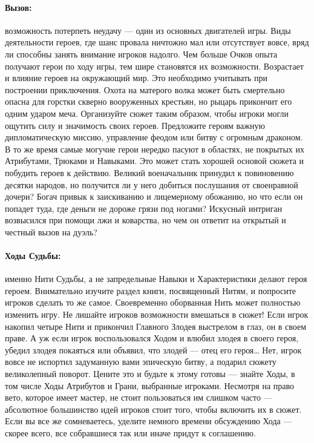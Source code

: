 \paragraph{Вызов:} возможность потерпеть неудачу — один из основных двигателей игры. Виды деятельности героев, где шанс провала ничтожно мал или отсутствует вовсе, вряд ли способны занять внимание игроков надолго.
\newline
Чем больше Очков опыта получают герои по ходу игры, тем шире становятся их возможности. Возрастает и влияние героев на окружающий мир. Это необходимо учитывать при построении приключения. Охота на матерого волка может быть смертельно опасна для горстки скверно вооруженных крестьян, но рыцарь прикончит его одним ударом меча. Организуйте сюжет таким образом, чтобы игроки могли ощутить силу и значимость своих героев. Предложите героям важную дипломатическую миссию, управление феодом или битву с огромным драконом.
\newline
В то же время самые могучие герои нередко пасуют в областях, не покрытых их Атрибутами, Трюками и Навыками. Это может стать хорошей основой сюжета и побудить героев к действию. Великий военачальник принудил к повиновению десятки народов, но получится ли у него добиться послушания от своенравной дочери? Богач привык к заискиванию и лицемерному обожанию, но что если он попадет туда, где деньги не дороже грязи под ногами? Искусный интриган возвысился при помощи лжи и коварства, но чем он ответит на открытый и честный вызов
на дуэль?
\paragraph{Ходы Судьбы:} именно Нити Судьбы, а не запредельные Навыки и Характеристики делают героя героем. Внимательно изучите раздел книги, посвященный Нитям, и попросите игроков сделать то же самое. Своевременно оборванная Нить может полностью изменить игру. Не лишайте игроков возможности вмешаться в сюжет! Если игрок накопил четыре Нити и прикончил Главного Злодея выстрелом в глаз, он в своем праве. А уж если игрок воспользовался Ходом и влюбил злодея в своего героя, убедил злодея покаяться или объявил, что злодей — отец его героя… Нет, игрок вовсе не испортил задуманную вами эпическую битву, а подарил сюжету великолепный поворот. Цените это и будьте к этому готовы — знайте Ходы, в том числе Ходы Атрибутов и Грани, выбранные игроками. Несмотря на право вето, которое имеет мастер, не стоит пользоваться им слишком часто — абсолютное большинство идей игроков стоит того, чтобы включить их в сюжет. Если вы все же сомневаетесь, уделите немного времени обсуждению Хода — скорее всего, все собравшиеся так или иначе придут к соглашению.
